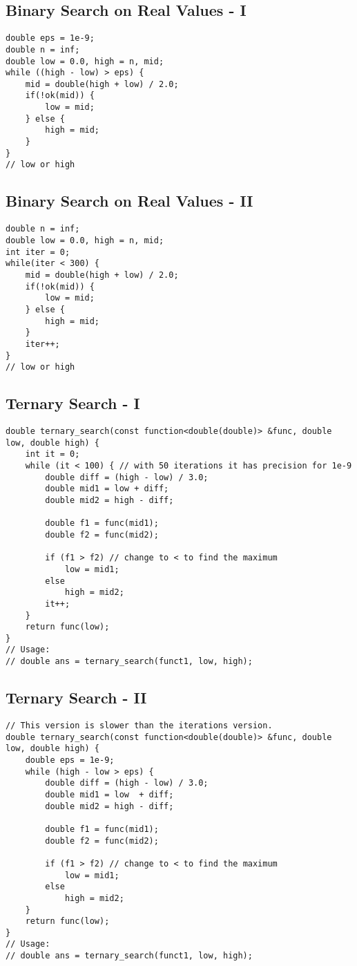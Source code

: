 \documentclass[10pt,letterpaper,twocolumn,twosided]{article}
\begin{document}
\subsection{Binary Search on Real Values - I}
\begin{lstlisting}
double eps = 1e-9;
double n = inf;
double low = 0.0, high = n, mid;
while ((high - low) > eps) {
    mid = double(high + low) / 2.0;
    if(!ok(mid)) {
        low = mid;
    } else {
        high = mid;
    }
}
// low or high
\end{lstlisting}

\subsection{Binary Search on Real Values - II}
\begin{lstlisting}
double n = inf;
double low = 0.0, high = n, mid;
int iter = 0;
while(iter < 300) {
    mid = double(high + low) / 2.0;
    if(!ok(mid)) {
        low = mid;
    } else {
        high = mid;
    }
    iter++;
}
// low or high
\end{lstlisting}

\subsection{Ternary Search - I}
\begin{lstlisting}
double ternary_search(const function<double(double)> &func, double low, double high) {
    int it = 0;
    while (it < 100) { // with 50 iterations it has precision for 1e-9
        double diff = (high - low) / 3.0;
        double mid1 = low + diff;
        double mid2 = high - diff;

        double f1 = func(mid1);
        double f2 = func(mid2);

        if (f1 > f2) // change to < to find the maximum
            low = mid1;
        else
            high = mid2;
        it++;
    }
    return func(low);
}
// Usage:
// double ans = ternary_search(funct1, low, high);
\end{lstlisting}

\subsection{Ternary Search - II}
\begin{lstlisting}
// This version is slower than the iterations version.
double ternary_search(const function<double(double)> &func, double low, double high) {
    double eps = 1e-9;
    while (high - low > eps) {
        double diff = (high - low) / 3.0;
        double mid1 = low  + diff;
        double mid2 = high - diff;

        double f1 = func(mid1);
        double f2 = func(mid2);

        if (f1 > f2) // change to < to find the maximum
            low = mid1;
        else
            high = mid2;
    }
    return func(low);
}
// Usage:
// double ans = ternary_search(funct1, low, high);
\end{lstlisting}
\end{document}
